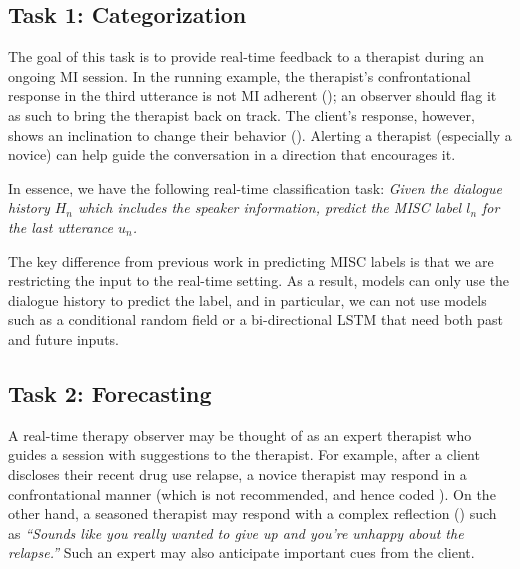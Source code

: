 \subsection{Task 1: Categorization}
\label{ssec:snt:task-categorization}
The goal of this task is to provide real-time feedback to a
therapist during an ongoing MI session. In the running example, the
therapist's confrontational response in the third utterance is not
MI adherent (\MIN); an observer should flag it as such to bring the
therapist back on track. The client's response, however, shows an
inclination to change their behavior (\CHANGE). Alerting a therapist
(especially a novice) can help guide the conversation in a direction
that encourages it.

In essence, we have the following real-time classification task:
\emph{Given the dialogue history $H_n$ which includes the speaker
  information, predict the MISC label $l_n$ for the last utterance
  $u_n$.}

The key difference from previous work in predicting MISC labels is
that we are restricting the input to the real-time setting. As a
result, models can only use the dialogue history to predict the label,
and in particular, we can not use models such as a conditional random
field or a bi-directional LSTM that need both past and future inputs.




\subsection{Task 2: Forecasting}
\label{ssec:snt:task-forcasting}
A real-time therapy observer may be thought of as an expert
therapist who guides a session with suggestions to the therapist.
For example, after a client discloses their recent drug use
relapse, a novice therapist may respond in a confrontational manner
(which is not recommended, and hence coded \MIN). On the other
hand, a seasoned therapist may respond with a complex reflection
(\REC) such as \emph{``Sounds like you really wanted to give up and
  you're unhappy about the relapse.''}
Such an expert may also anticipate important cues
from the client.%

